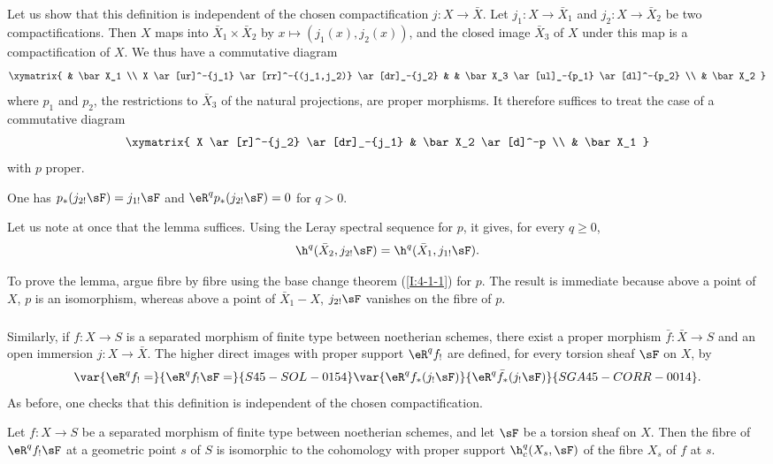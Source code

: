 Let us show that this definition is independent of the chosen
compactification $j:X\to\bar X$. Let $j_1:X\to\bar X_1$ and
$j_2:X\to\bar X_2$ be two compactifications. Then $X$ maps into
$\bar X_1\times\bar X_2$ by $x\mapsto(j_1(x),j_2(x))$, and
the closed image $\bar X_3$ of $X$ under this map is a compactification
of $X$. We thus have a commutative diagram
\[\xymatrix{
  & \bar X_1 \\
  X \ar[ur]^-{j_1} \ar[rr]^-{(j_1,j_2)} \ar[dr]_-{j_2}
    & & \bar X_3 \ar[ul]_-{p_1} \ar[dl]^-{p_2} \\
  & \bar X_2
}\]
where $p_1$ and $p_2$, the restrictions to $\bar X_3$ of the natural
projections, are proper morphisms. It therefore suffices to treat the case
of a commutative diagram
\[\xymatrix{
  X \ar[r]^-{j_2} \ar[dr]_-{j_1}
    & \bar X_2 \ar[d]^-p \\
  & \bar X_1
}\]
with $p$ proper.

\begin{lemma}\label{I:4-5-2}
One has $p_*(j_{2!}\sF)=j_{1!}\sF$ and
$\eR^qp_*(j_{2!}\sF)=0$ for $q>0$.
\end{lemma}

Let us note at once that the lemma suffices. Using the Leray spectral
sequence for $p$, it gives, for every $q\geqslant0$,
\[
  \h^q(\bar X_2, j_{2!} \sF) = \h^q(\bar X_1, j_{1!} \sF) \text{.}
\]

To prove the lemma, argue fibre by fibre using the base change theorem
(\ref{I:4-1-1}) for $p$. The result is immediate because above a point
of $X$, $p$ is an isomorphism, whereas above a point of
$\bar X_1- X$, $j_{2!}\sF$ vanishes on the fibre of $p$.

\subsubsection{}\label{I:4-5-3}

Similarly, if $f:X\to S$ is a separated morphism of finite type between
noetherian schemes, there exist a proper morphism $\bar f:\bar X\to S$
and an open immersion $j:X\to\bar X$. The higher direct images with
proper support $\eR^qf_!$ are defined, for every torsion sheaf $\sF$ on
$X$, by
\[
  \var{\eR^q f_! =}{\eR^q f_! \sF =}{S45-SOL-0154} \var{\eR^q f_*(j_! \sF)}{\eR^q \bar f_*(j_! \sF)}{SGA45-CORR-0014} \text{.}
\]
As before, one checks that this definition is independent of the chosen
compactification.

\begin{theorem}\label{I:4-5-4}
Let $f:X\to S$ be a separated morphism of finite type between noetherian
schemes, and let $\sF$ be a torsion sheaf on $X$. Then the fibre of
$\eR^qf_!\sF$ at a geometric point $s$ of $S$ is isomorphic to the
cohomology with proper support $\h_c^q(X_s,\sF)$ of the fibre $X_s$ of
$f$ at $s$.
\end{theorem}


